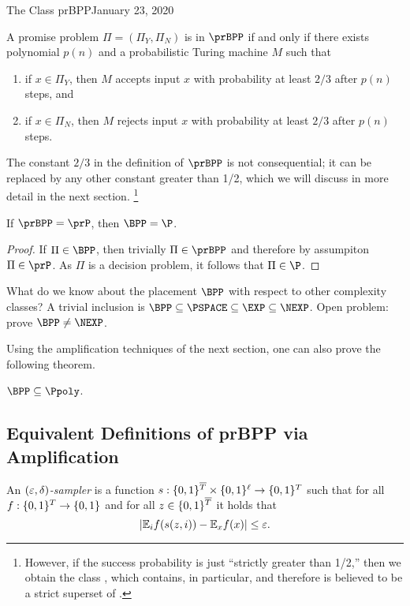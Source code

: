 \begin{lecture}{1}{The Class prBPP}{January 23, 2020}
\begin{definition}[$\prBPP$]
  A promise problem $\Pi = (\Pi_Y, \Pi_N)$ is in $\prBPP$ if and only if there
  exists polynomial $p(n)$ and a probabilistic Turing machine $M$ such that
  \begin{enumerate}
    \item if $x \in \Pi_Y$, then $M$ accepts input $x$ with probability at
      least $2/3$ after $p(n)$ steps, and
    \item if $x \in \Pi_N$, then $M$ rejects input $x$ with probability at
      least $2/3$ after $p(n)$ steps.
  \end{enumerate}
\end{definition}

The constant $2/3$ in the definition of $\prBPP$ is not consequential; it
can be replaced by any other constant greater than 1/2, which we will discuss
in more detail in the next section.%
\footnote{However, if the success probability is just ``strictly greater than
  1/2,'' then we obtain the class \PP, which contains, in particular, \NP and
  therefore is believed to be a strict superset of \BPP.}

\begin{proposition}
  If $\prBPP = \prP$, then $\BPP = \P$.
\end{proposition}

\begin{proof}
  If $\Pi \in \BPP$, then trivially $\Pi \in \prBPP$ and therefore by
  assumpiton $\Pi \in \prP$. As $\Pi$ is a decision problem, it follows
  that $\Pi \in \P$.
\end{proof}

What do we know about the placement $\BPP$ with respect to other complexity
classes? A trivial inclusion is $\BPP \subseteq \PSPACE \subseteq \EXP
\subseteq \NEXP$. Open problem: prove $\BPP \ne \NEXP$.

Using the amplification techniques of the next section, one can also prove
the following theorem.

\begin{theorem}
  $\BPP \subseteq \Ppoly$.
\end{theorem}


\subsection{Equivalent Definitions of prBPP via Amplification}

\begin{definition}
  An \emph{$(\varepsilon, \delta)$-sampler} is a function $s :
  \{0,1\}^{\overline{T}} \times \{0,1\}^\ell \to \{0,1\}^T$ such that for
  all $f : \{0,1\}^T \to \{0,1\}$ and for all $z \in
  \{0,1\}^{\overline{T}}$ it holds that \[
    |\mathbb{E}_i f(s(z, i)) - \mathbb{E}_x f(x)| \le \varepsilon.
  \]
\end{definition}


\end{lecture}
